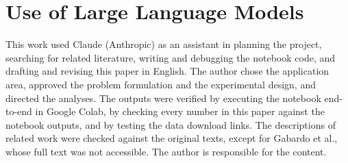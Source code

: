 \documentclass[12pt]{article}
\begin{document}
\section*{Use of Large Language Models}

This work used Claude (Anthropic) as an assistant in planning the project,
searching for related literature, writing and debugging the notebook code, and
drafting and revising this paper in English. The author chose the application
area, approved the problem formulation and the experimental design, and
directed the analyses. The outputs were verified by executing the notebook
end-to-end in Google Colab, by checking every number in this paper against the
notebook outputs, and by testing the data download links. The descriptions of related work
were checked against the original texts, except for Gabardo et al., whose full
text was not accessible.
The author is responsible for the content.



\end{document}
